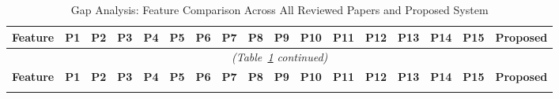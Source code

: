 \documentclass[12pt, a4paper]{article}
\begin{document}
\begin{landscape}
\begin{scriptsize}
\setlength{\tabcolsep}{3pt}
\begin{longtable}{|l|*{15}{c|}c|}
\caption{Gap Analysis: Feature Comparison Across All Reviewed Papers and Proposed System}
\label{tab:gapanalysis}\\
\hline
\textbf{Feature} &
\textbf{P1} & \textbf{P2} & \textbf{P3} & \textbf{P4} & \textbf{P5} &
\textbf{P6} & \textbf{P7} & \textbf{P8} & \textbf{P9} & \textbf{P10} &
\textbf{P11} & \textbf{P12} & \textbf{P13} & \textbf{P14} & \textbf{P15} &
\textbf{Proposed} \\
\hline
\endfirsthead
\multicolumn{17}{c}{\scriptsize\itshape (Table~\ref{tab:gapanalysis} continued)}\\
\hline
\textbf{Feature} &
\textbf{P1} & \textbf{P2} & \textbf{P3} & \textbf{P4} & \textbf{P5} &
\textbf{P6} & \textbf{P7} & \textbf{P8} & \textbf{P9} & \textbf{P10} &
\textbf{P11} & \textbf{P12} & \textbf{P13} & \textbf{P14} & \textbf{P15} &
\textbf{Proposed} \\
\hline
\endhead
\hline
\endlastfoot


\end{longtable}
\end{scriptsize}
\end{landscape}
\end{document}
